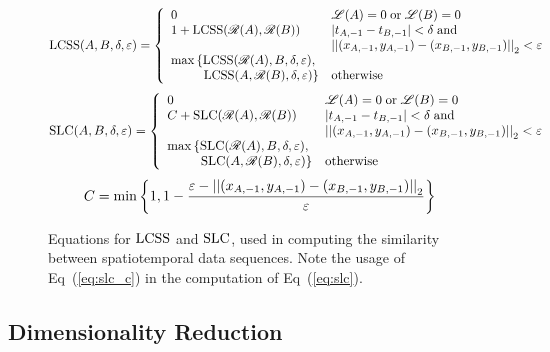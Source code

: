 \begin{figure*}
	\centering
	\begin{equation}
		\LCSS(A,B,\delta,\varepsilon)=\left\{\begin{array}{ll}
			0 & \mathscr{L}(A)=0\;\ptxt{or}\;\mathscr{L}(B)=0\\
			1+\LCSS(\mathscr{R}(A),\mathscr{R}(B)) & \abs{t_{A,-1}-t_{B,-1}}<\delta\;\ptxt{and}\;\\
			& \norm{(x_{A,-1},y_{A,-1})-(x_{B,-1},y_{B,-1})}_{2}<\varepsilon\\
			\max\left\{\LCSS(\mathscr{R}(A),B,\delta,\varepsilon),\right.\\
			\phantom{\max\left\{\right.}\!\!\left.\LCSS(A,\mathscr{R}(B),\delta,\varepsilon)\right\} & \ptxt{otherwise}
		\end{array}\right.
		\label{eq:lcss}
	\end{equation}
	\begin{equation}
		\SLC(A,B,\delta,\varepsilon)=\left\{\begin{array}{ll}
			0 & \mathscr{L}(A)=0\;\ptxt{or}\;\mathscr{L}(B)=0\\
			C+\SLC(\mathscr{R}(A),\mathscr{R}(B)) & \abs{t_{A,-1}-t_{B,-1}}<\delta\;\ptxt{and}\;\\
			& \norm{(x_{A,-1},y_{A,-1})-(x_{B,-1},y_{B,-1})}_{2}<\varepsilon\\
			\max\left\{\SLC(\mathscr{R}(A),B,\delta,\varepsilon),\right.\\
			\phantom{\max\left\{\right.}\!\!\left.\SLC(A,\mathscr{R}(B),\delta,\varepsilon)\right\} & \ptxt{otherwise}
		\end{array}\right.
		\label{eq:slc}
	\end{equation}
	\begin{equation}
		C=\min\left\{1,1-\frac{\varepsilon-\left|\left|(x_{A,-1},y_{A,-1})-(x_{B,-1},y_{B,-1})\right|\right|_{2}}{\varepsilon}\right\}
		\label{eq:slc_c}
	\end{equation}
	\caption{Equations for $\operatorname{LCSS}$ and $\operatorname{SLC}$, used in computing the similarity between spatiotemporal data sequences. Note the usage of Eq~(\ref{eq:slc_c}) in the computation of Eq~(\ref{eq:slc}).}
	\label{fig:subsequences}
\end{figure*}

\subsection{Dimensionality Reduction}


